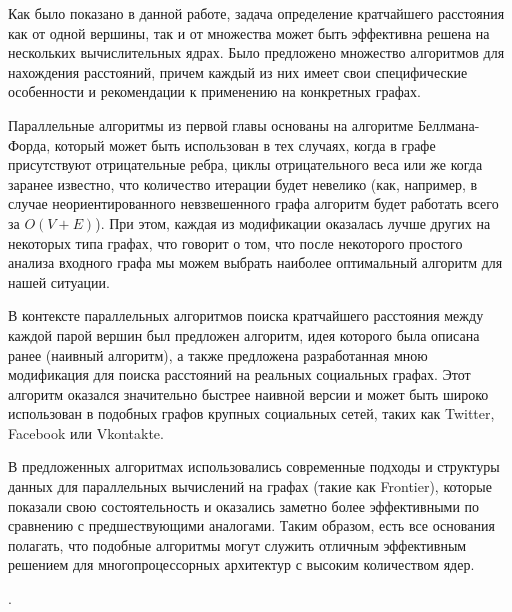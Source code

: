 \startconclusionpage

Как было показано в данной работе, задача определение кратчайшего расстояния как от одной вершины, так и от множества может быть эффективна решена на нескольких вычислительных ядрах. Было предложено множество алгоритмов для нахождения расстояний, причем каждый из них имеет свои специфические особенности и рекомендации к применению на конкретных графах.

Параллельные алгоритмы из первой главы основаны на алгоритме Беллмана-Форда, который может быть использован в тех случаях, когда в графе присутствуют отрицательные ребра, циклы отрицательного веса или же когда заранее известно, что количество итерации будет невелико (как, например, в случае неориентированного невзвешенного графа алгоритм будет работать всего за $O(V + E)$). При этом, каждая из модификации оказалась лучше других на некоторых типа графах, что говорит о том, что после некоторого простого анализа входного графа мы можем выбрать наиболее оптимальный алгоритм для нашей ситуации.

В контексте параллельных алгоритмов поиска кратчайшего расстояния между каждой парой вершин был предложен алгоритм, идея которого была описана ранее (наивный алгоритм), а также предложена разработанная мною модификация для поиска расстояний на реальных социальных графах. Этот алгоритм оказался значительно быстрее наивной версии и может быть широко использован в подобных графов крупных социальных сетей, таких как Twitter, Facebook или Vkontakte. 

В предложенных алгоритмах использовались современные подходы и структуры данных для параллельных вычислений на графах (такие как Frontier), которые показали свою состоятельность и оказались заметно более эффективными по сравнению с предшествующими аналогами. Таким образом, есть все основания полагать, что подобные алгоритмы могут служить отличным эффективным решением для многопроцессорных архитектур с высоким количеством ядер.

\cite{APREC}. 


\FloatBarrier
